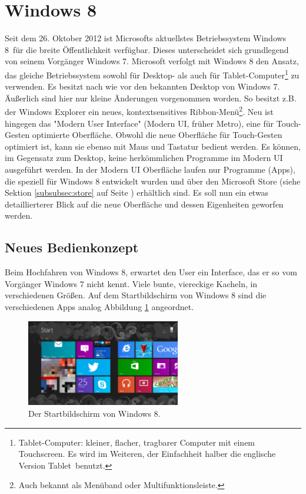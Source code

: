 \documentclass[12pt,a4paper,bibtotoc,abstracton]{scrartcl}
\begin{document}
\section{Windows 8}
\label{sec:windows8}
Seit dem 26. Oktober 2012 ist Microsofts aktuellstes Betriebssystem \glqq Windows 8\grqq\ für die breite Öffentlichkeit verfügbar. Dieses unterscheidet sich grundlegend von seinem Vorgänger \glqq Windows 7\grqq. Microsoft verfolgt mit Windows 8 den Ansatz, das gleiche Betriebssystem sowohl für Desktop- als auch für Tablet-Computer\footnote{Tablet-Computer: kleiner, flacher, tragbarer Computer mit einem Touchscreen. Es wird im Weiteren, der Einfachheit halber die englische Version \glqq Tablet\grqq\ benutzt.} zu verwenden. Es besitzt nach wie vor den bekannten Desktop von Windows 7. Äußerlich sind hier nur kleine Änderungen vorgenommen worden. So besitzt z.B. der Windows Explorer ein neues, kontextsensitives Ribbon-Menü\footnote{Auch bekannt als Menüband oder Multifunktionsleiste.}. Neu ist hingegen das "Modern User Interface" (Modern UI, früher Metro), eine für Touch-Gesten optimierte Oberfläche. Obwohl die neue Oberfläche für Touch-Gesten optimiert ist, kann sie ebenso mit Maus und Tastatur bedient werden. Es können, im Gegensatz zum Desktop, keine herkömmlichen Programme im Modern UI ausgeführt werden. In der Modern UI Oberfläche laufen nur Programme (Apps), die speziell für Windows 8 entwickelt wurden und über den Microsoft Store (siehe Sektion \ref{subsubsec:store} auf Seite \pageref{subsubsec:store}) erhältlich sind. Es soll nun ein etwas detaillierterer Blick auf die neue Oberfläche und dessen Eigenheiten geworfen werden.

\subsection{Neues Bedienkonzept}
\label{subsec:bedienkonzept}
Beim Hochfahren von Windows 8, erwartet den User ein Interface, das er so vom Vorgänger Windows 7 nicht kennt. Viele bunte, viereckige Kacheln, in verschiedenen Größen. Auf dem Startbildschirm von Windows 8 sind die verschiedenen Apps analog Abbildung \ref{fig:win8startscreen} angeordnet.

\begin{figure}[h]	
	\centering
	\includegraphics[width=0.6\textwidth]{Bilder/Screenshots/windows8/win8_startscreen.png} 
	\caption{Der Startbildschirm von Windows 8.}
	\label{fig:win8startscreen}
\end{figure}
\end{document}
